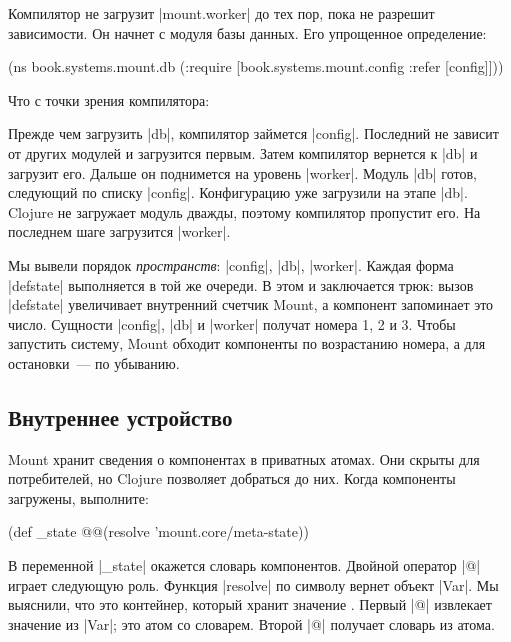 Компилятор не загрузит \spverb|mount.worker| до тех пор, пока не разрешит
зависимости. Он начнет с модуля базы данных. Его упрощенное определение:

\begin{english}
  \begin{clojure}
(ns book.systems.mount.db
  (:require
   [book.systems.mount.config :refer [config]]))
  \end{clojure}
\end{english}

\noindent
Что с точки зрения компилятора:


Прежде чем загрузить \spverb|db|, компилятор займется \spverb|config|. Последний
не зависит от других модулей и загрузится первым. Затем компилятор вернется к
\spverb|db| и загрузит его. Дальше он поднимется на уровень
\spverb|worker|. Модуль \spverb|db| готов, следующий по списку
\spverb|config|. Конфигурацию уже загрузили на этапе \spverb|db|. Clojure не
загружает модуль дважды, поэтому компилятор пропустит его. На последнем шаге
загрузится \spverb|worker|.

Мы вывели порядок \emph{пространств}: \spverb|config|, \spverb|db|,
\spverb|worker|. Каждая форма \spverb|defstate| выполняется в той же очереди. В
этом и заключается трюк: вызов \spverb|defstate| увеличивает внутренний счетчик
Mount, а компонент запоминает это число. Сущности \spverb|config|, \spverb|db| и
\spverb|worker| получат номера 1, 2 и 3. Чтобы запустить систему, Mount
обходит компоненты по возрастанию номера, а для остановки~--- по убыванию.

\subsection{Внутреннее устройство}

Mount хранит сведения о компонентах в приватных атомах. Они скрыты для
потребителей, но Clojure позволяет добраться до них. Когда компоненты загружены,
выполните:

\begin{english}
  \begin{clojure}
(def _state @@(resolve 'mount.core/meta-state))
  \end{clojure}
\end{english}

В переменной \spverb|_state| окажется словарь компонентов. Двойной оператор
\spverb|@| играет следующую роль. Функция \spverb|resolve| по символу вернет
объект \spverb|Var|. Мы выяснили, что это контейнер, который хранит
значение . Первый \spverb|@| извлекает значение из
\spverb|Var|; это атом со словарем. Второй \spverb|@| получает словарь из атома.

